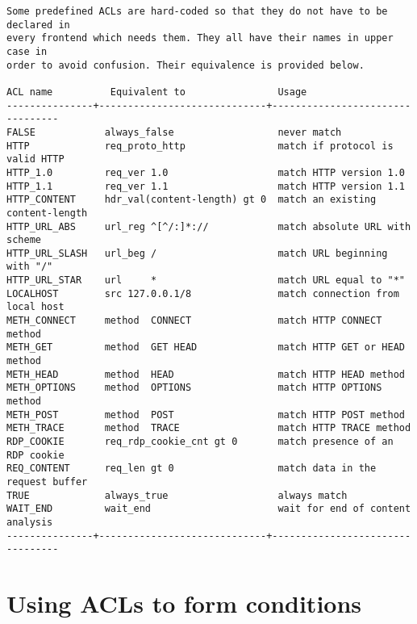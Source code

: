 \begin{verbatim}
Some predefined ACLs are hard-coded so that they do not have to be declared in
every frontend which needs them. They all have their names in upper case in
order to avoid confusion. Their equivalence is provided below.

ACL name          Equivalent to                Usage
---------------+-----------------------------+---------------------------------
FALSE            always_false                  never match
HTTP             req_proto_http                match if protocol is valid HTTP
HTTP_1.0         req_ver 1.0                   match HTTP version 1.0
HTTP_1.1         req_ver 1.1                   match HTTP version 1.1
HTTP_CONTENT     hdr_val(content-length) gt 0  match an existing content-length
HTTP_URL_ABS     url_reg ^[^/:]*://            match absolute URL with scheme
HTTP_URL_SLASH   url_beg /                     match URL beginning with "/"
HTTP_URL_STAR    url     *                     match URL equal to "*"
LOCALHOST        src 127.0.0.1/8               match connection from local host
METH_CONNECT     method  CONNECT               match HTTP CONNECT method
METH_GET         method  GET HEAD              match HTTP GET or HEAD method
METH_HEAD        method  HEAD                  match HTTP HEAD method
METH_OPTIONS     method  OPTIONS               match HTTP OPTIONS method
METH_POST        method  POST                  match HTTP POST method
METH_TRACE       method  TRACE                 match HTTP TRACE method
RDP_COOKIE       req_rdp_cookie_cnt gt 0       match presence of an RDP cookie
REQ_CONTENT      req_len gt 0                  match data in the request buffer
TRUE             always_true                   always match
WAIT_END         wait_end                      wait for end of content analysis
---------------+-----------------------------+---------------------------------
\end{verbatim}

\section{Using ACLs to form conditions}

